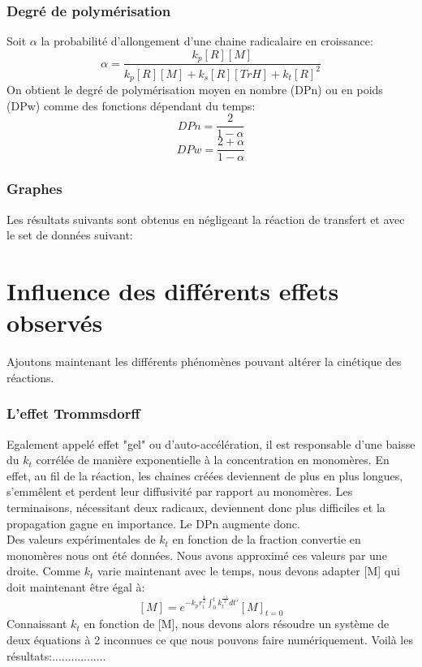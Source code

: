 \documentclass[a4paper,oneside,12pt]{article}
\begin{document}
\section{Degré de polymérisation}
Soit $\alpha$ la probabilité d'allongement d'une chaine radicalaire en croissance: 
$$\alpha=\frac{k_p[R][M]}{k_p[R][M]+k_s[R][TrH]+k_t[R]^2}$$
On obtient le degré de polymérisation moyen en nombre (DPn) ou en poids (DPw) comme des fonctions dépendant du temps:
$$DPn=\frac{2}{1-\alpha}$$
$$DPw=\frac{2+\alpha}{1-\alpha}$$

\section{Graphes}
Les résultats suivants sont obtenus en négligeant la réaction de transfert et avec le set de données suivant:


\part{Influence des différents effets observés}

Ajoutons maintenant les différents phénomènes pouvant altérer la cinétique des réactions.\\

\section{L'effet Trommsdorff} 
Egalement appelé effet "gel" ou d'auto-accélération, il est responsable d'une baisse du $k_t$ corrélée de manière exponentielle à la concentration en monomères. En effet, au fil de la réaction, les chaines créées deviennent de plus en plus longues, s'emmêlent et perdent leur diffusivité par rapport au monomères. Les terminaisons, nécessitant deux radicaux, deviennent donc plus difficiles et la propagation gagne en importance. Le DPn augmente donc.\\
Des valeurs expérimentales de $k_t$ en fonction de la fraction convertie en monomères nous ont été données. Nous avons approximé ces valeurs par une droite. Comme $k_t$ varie maintenant avec le temps, nous devons adapter [M] qui doit maintenant être égal à:
$$[M]=e^{-k_pr_i^{\frac{1}{2}}\int_0^t k_t^{\frac{-1}{2}}dt'}[M]_{t=0}$$
Connaissant $k_t$ en fonction de [M], nous devons alors résoudre un système de deux équations à 2 inconnues ce que nous pouvons faire numériquement. Voilà les résultats:.................
\space
\end{document}
